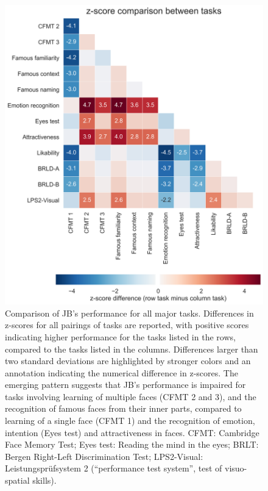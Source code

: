 \documentclass[fleqn,10pt]{SelfArx} %
\begin{document}
\begin{figure}[htbp]
	
	\renewcommand{\familydefault}{\sfdefault}\normalfont
	\centering
	\includegraphics[width=\columnwidth]{../reports/figures/overview_heatmap_mod.png}
	\vspace*{-3mm}
 		\caption{Comparison of JB's performance for all major tasks. Differences in z-scores for all pairings of tasks are reported, with positive scores indicating higher performance for the tasks listed in the rows, compared to the tasks listed in the columns. Differences larger than two standard deviations are highlighted by stronger colors and an annotation indicating the numerical difference in z-scores. The emerging pattern suggests that JB’s performance is impaired for tasks involving learning of multiple faces (CFMT 2 and 3), and the recognition of famous faces from their inner parts, compared to learning of a single face (CFMT 1) and the recognition of emotion, intention (Eyes test) and attractiveness in faces. CFMT: Cambridge Face Memory Test; Eyes test: Reading the mind in the eyes; BRLT: Bergen Right-Left Discrimination Test; LPS2-Visual: Leistungsprüfsystem 2 (“performance test system”, test of visuo-spatial skills).}%
 		\label{fig:heat}
	
\end{figure}
\end{document}
